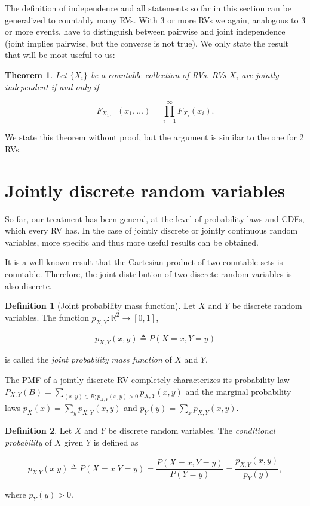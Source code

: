 \documentclass{book}
\theoremstyle{plain}%
\newtheorem{theorem}{Theorem}[section]
\theoremstyle{definition}
\newtheorem{definition}{Definition}[section]
\newlength{\arrow}
\begin{document}
The definition of independence and all statements so far in this section can be generalized to countably many RVs. With 3 or more RVs we again, analogous to 3 or more events, have to distinguish between pairwise and joint independence (joint implies pairwise, but the converse is not true). We only state the result that will be most useful to us:

\begin{theorem}
Let $\{X_i\}$ be a countable collection of RVs. RVs $X_i$ are jointly independent if and only if

$$F_{X_1,\dots}(x_1,\dots) = \prod_{i=1}^\infty F_{X_i}(x_i).$$
\end{theorem}

We state this theorem without proof, but the argument is similar to the one for 2 RVs.

\section{Jointly discrete random variables}

So far, our treatment has been general, at the level of probability laws and CDFs, which every RV has. In the case of jointly discrete or jointly continuous random variables, more specific and thus more useful results can be obtained.

It is a well-known result that the Cartesian product of two countable sets is countable. Therefore, the joint distribution of two discrete random variables is also discrete.

\begin{definition}[Joint probability mass function]
Let $X$ and $Y$ be discrete random variables. The function $p_{X,Y}: \mathbb{R}^2 \rightarrow [0,1]$, 

$$p_{X,Y}(x,y) \triangleq P(X = x, Y = y)$$ 

is called the \emph{joint probability mass function} of $X$ and $Y$.
\end{definition}

The PMF of a jointly discrete RV completely characterizes its probability law $P_{X,Y}(B) = \sum_{(x,y) \in B; p_{X,Y}(x,y) > 0} p_{X,Y}(x,y)$ and the marginal probability laws $p_X(x) = \sum_y  p_{X,Y}(x,y)$ and $p_Y(y) = \sum_x p_{X,Y}(x,y)$.

\begin{definition}
Let $X$ and $Y$ be discrete random variables. The \emph{conditional probability} of $X$ given $Y$ is defined as

$$p_{X|Y}(x|y) \triangleq P(X = x|Y = y) = \frac{P(X=x, Y=y)}{P(Y=y)} = \frac{p_{X,Y}(x, y)}{p_Y(y)},$$

where $p_Y(y) > 0$.
\end{definition}
\end{document}
